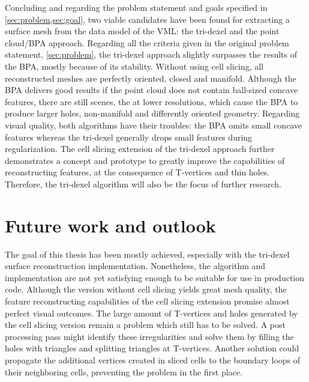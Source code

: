 Concluding and regarding the problem statement and goals specified in \cref{sec:problem,sec:goal}, two viable candidates have been found for extracting a surface mesh from the data model of the VML: the tri-dexel and the point cloud/BPA approach.
Regarding all the criteria given in the original problem statement, \cf \cref{sec:problem}, the tri-dexel approach slightly surpasses the results of the BPA, mostly because of its stability.
Without using cell slicing, all reconstructed meshes are perfectly oriented, closed and manifold.
Although the BPA delivers good results if the point cloud does not contain ball-sized concave features, there are still scenes, \cf the \turbine at lower resolutions, which cause the BPA to produce larger holes, non-manifold and differently oriented geometry.
Regarding visual quality, both algorithms have their troubles: the BPA omits small concave features whereas the tri-dexel generally drops small features during regularization.
The cell slicing extension of the tri-dexel approach further demonstrates a concept and prototype to greatly improve the capabilities of reconstructing features, at the consequence of T-vertices and thin holes.
Therefore, the tri-dexel algorithm will also be the focus of further research.


\section{Future work and outlook}
\label{sec:outlook}

The goal of this thesis has been mostly achieved, especially with the tri-dexel surface reconstruction implementation.
Nonetheless, the algorithm and implementation are not yet satisfying enough to be suitable for use in production code.
Although the version without cell slicing yields great mesh quality, the feature reconstructing capabilities of the cell slicing extension promise almost perfect visual outcomes.
The large amount of T-vertices and holes generated by the cell slicing version remain a problem which still has to be solved.
A post processing pass might identify these irregularities and solve them by filling the holes with triangles and splitting triangles at T-vertices.
Another solution could propagate the additional vertices created in sliced cells to the boundary loops of their neighboring cells, preventing the problem in the first place.

